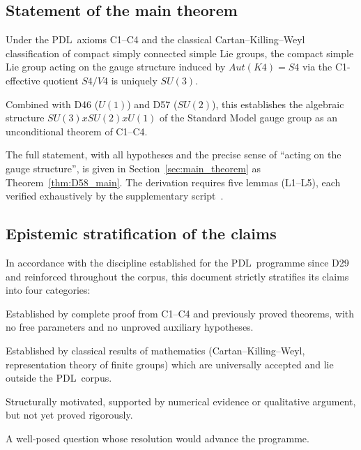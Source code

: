 \documentclass[11pt,a4paper]{article}
\def\Sfour{S4}%
\def\Vfour{V4}%
\def\SUthree{SU(3)}%
\def\SUtwo{SU(2)}%
\def\Uone{U(1)}%
\def\Kfour{K4}%
\def\PDL{PDL}%
\def\times{x}%
\def\Aut{Aut}%
\def\mathrm#1{#1}%
\def\textsc#1{#1}%
\theoremstyle{plain}
\theoremstyle{definition}
\theoremstyle{remark}
\newenvironment{theorembox}[1][]{%
  \begin{tcolorbox}[theoremstyle,title={Theorem\ifx\relax#1\relax\else: #1\fi}]}{\end{tcolorbox}}
\newcommand{\PDL}{\textsc{PDL}}
\newcommand{\Kfour}{K_4}
\newcommand{\Sfour}{S_4}
\newcommand{\Vfour}{V_4}
\newcommand{\SUthree}{\mathrm{SU}(3)}
\newcommand{\SUtwo}{\mathrm{SU}(2)}
\newcommand{\Uone}{\mathrm{U}(1)}
\newcommand{\Aut}{\mathrm{Aut}}
\begin{document}
\subsection{Statement of the main theorem}
\label{subsec:statement}

\begin{theorembox}[Main theorem of D58 --- preview]
\label{thm:D58_preview}
Under the \PDL\ axioms C1--C4 and the classical Cartan--Killing--Weyl classification of compact simply connected simple Lie groups, the compact simple Lie group acting on the gauge structure induced by $\Aut(\Kfour) = \Sfour$ via the C1-effective quotient $\Sfour/\Vfour$ is uniquely $\SUthree$.

Combined with D46 ($\Uone$) and D57 ($\SUtwo$), this establishes the algebraic structure $\SUthree \times \SUtwo \times \Uone$ of the Standard Model gauge group as an unconditional theorem of C1--C4.
\end{theorembox}

The full statement, with all hypotheses and the precise sense of ``acting on the gauge structure'', is given in Section~\ref{sec:main_theorem} as Theorem~\ref{thm:D58_main}. The derivation requires five lemmas (L1--L5), each verified exhaustively by the supplementary script~\cite{PDL_SU3_script1}.

\subsection{Epistemic stratification of the claims}
\label{subsec:epistemic_strat}

In accordance with the discipline established for the \PDL\ programme since D29 and reinforced throughout the corpus, this document strictly stratifies its claims into four categories:

\begin{description}[leftmargin=2.5cm,style=nextline]
\item[\textcolor{proofblue}{Theorem}] Established by complete proof from C1--C4 and previously proved theorems, with no free parameters and no unproved auxiliary hypotheses.
\item[\textcolor{proofblue}{Theorem (classical)}] Established by classical results of mathematics (Cartan--Killing--Weyl, representation theory of finite groups) which are universally accepted and lie outside the \PDL\ corpus.
\item[\textcolor{conjecturegreen}{Conjecture}] Structurally motivated, supported by numerical evidence or qualitative argument, but not yet proved rigorously.
\item[\textcolor{openproblemred}{Open Problem}] A well-posed question whose resolution would advance the programme.
\end{description}
\end{document}

